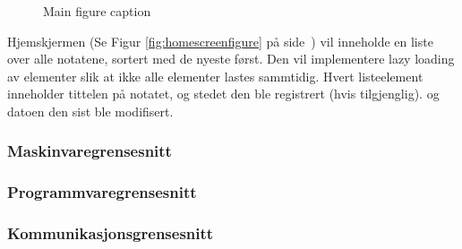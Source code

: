 \documentclass[a4paper, 12pt]{article}
\begin{document}
\begin{figure}[hb]
{		\label{fig:subfigure3}}
	\quad
	\caption{Main figure caption}
\label{fig:figure}
\end{figure}

Hjemskjermen (Se Figur \ref{fig:homescreenfigure} på side~\pageref{fig:homescreenfigure}) vil inneholde en liste over alle notatene, sortert med de nyeste først. Den vil implementere lazy loading av elementer slik at ikke alle elementer lastes sammtidig. Hvert listeelement inneholder tittelen på notatet, og stedet den ble registrert (hvis tilgjenglig). og datoen den sist ble modifisert. 


\subsubsection{Maskinvaregrensesnitt}

\subsubsection{Programmvaregrensesnitt}

\subsubsection{Kommunikasjonsgrensesnitt}
\end{document}
